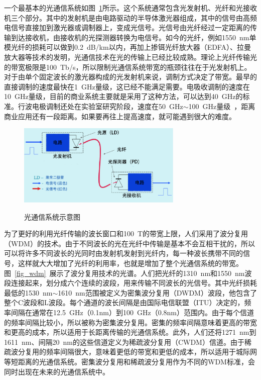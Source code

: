 \documentclass{ZJUthesis}
\begin{document}
一个最基本的光通信系统如图~\ref{fig_system}所示。这个系统通常包含光发射机、光纤和光接收机三个部分。其中的发射机是由电路驱动的半导体激光器组成，其中的信号由高频电信号直接加到激光器或调制器上，变成光信号。光信号由光纤经过一定距离的传输到达接收机，由接收机的光探测器转换为电信号。如今的光纤，例如1550~nm单模光纤的损耗可以做到0.2~dB/km以内，再加上掺铒光纤放大器（EDFA）\cite{Tachibana1991Erbium}\cite{Laming1992Erbium}、拉曼放大器\cite{Bromage2004Raman}等技术的发明，光通信技术在光的传输上已经比较成熟。理论上光纤传输光的带宽极限是100~Tb/s，所以限制光通信系统带宽的瓶颈往往在于光发射机上。对于由单个固定波长的激光器构成的光发射机来说，调制方式决定了带宽。最早的直接调制的速度最快在1~GHz量级\cite{Utaka1981Single}\cite{Saito2001Low}，这已经不能满足需要。电吸收调制的速度在10~GHz量级\cite{Ido1996Ultra}，目前的商业系统主要就是采用了这种方法，可以达到40~GHz的标准。行波电极调制还处在实验室研究阶段，速度在50~GHz$\sim$100~GHz量级\cite{Kawano1997Polarisation}\cite{Li1999Ultrahigh}\cite{Irmscher2002InP}~，距离商业应用还有一段距离。如果要再往上提高速度，就可能遇到很大的难度。

\begin{figure}[htbp]
  \centering
  \includegraphics[width=0.7\textwidth]{./Pictures/system.eps}\\
  \caption{光通信系统示意图}
  \label{fig_system}
\end{figure}

为了更好的利用光纤传输的波长窗口和100~T的带宽上限，人们采用了波分复用（WDM）的技术。由于不同波长的光在光纤中传输是基本不会互相干扰的，所以可以将许多不同波长的光同时由发射机发射到光纤内，每一种波长携带不同的信号，这样就大大增加了光纤的利用率，也就是增加了整个光通信系统的带宽。图~\ref{fig_wdm}~展示了波分复用技术的光谱。人们把光纤的1310~nm和1550~nm波段连接起来，划分成六个连续的波段，用来传输不同波长的光信号。其中光纤损耗最低的1530~nm$\sim$1610~nm范围被定义为密集波分复用（DWDM）波段，他包含了整个C波段和L波段。每个通道的波长间隔是由国际电信联盟（ITU）决定的，频率间隔在通常在12.5~GHz（0.1nm）到100~GHz（0.8nm）范围内。由于每个信道的频率间隔比较小，所以被称为密集波分复用。密集的频率间隔意味着更高的带宽和更高的成本，所以适用于长距离传输的光通信系统。此外，人们还将1271~nm到1611~nm、间隔20~nm的这些信道定义为稀疏波分复用（CWDM）信道。由于稀疏波分复用的频率间隔很大，意味着更低的带宽和更低的成本，所以适用于城际网等短距离的光通信系统。密集波分复用和稀疏波分复用作为不同的WDM标准，会同时出现在未来的光通信系统中。
\end{document}
